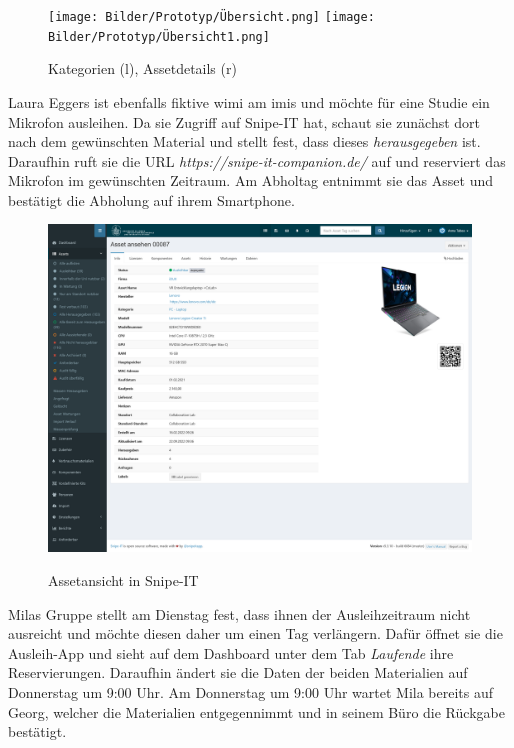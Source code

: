 \begin{figure}[h]
    \centering
    \texttt{[image: Bilder/Prototyp/Übersicht.png]}\hspace{2em}
    \texttt{[image: Bilder/Prototyp/Übersicht1.png]}
    \label{fig:p4}
    \caption[Mockup: Kategorien, Assets, Assetdetails]{Kategorien (l), Assetdetails (r)}
\end{figure}

Laura Eggers ist ebenfalls fiktive \ac{wimi} am \ac{imis} und möchte für eine
Studie ein Mikrofon ausleihen. Da sie Zugriff auf Snipe-IT hat, schaut sie
zunächst dort nach dem gewünschten Material und stellt fest, dass dieses
\textit{herausgegeben} ist. Daraufhin ruft sie die URL
\textit{https://snipe-it-companion.de/} auf und reserviert das Mikrofon im
gewünschten Zeitraum. Am Abholtag entnimmt sie das Asset und bestätigt die
Abholung auf ihrem Smartphone. 

\begin{figure}[h]
    \centering
    \includegraphics[scale=0.16]{Bilder/Screenshot 2022-10-14 at 11-26-25 Asset ansehen 00087 Ausleihmanagement.png}
    \label{fig:p4}
    \caption[Assetansicht in Snipe-IT]{Assetansicht in Snipe-IT}
\end{figure}

Milas Gruppe stellt am Dienstag fest, dass ihnen der Ausleihzeitraum nicht
ausreicht und möchte diesen daher um einen Tag verlängern. Dafür öffnet sie die
Ausleih-App und sieht auf dem Dashboard unter dem Tab \textit{Laufende} ihre
Reservierungen. Daraufhin ändert sie die Daten der beiden Materialien auf
Donnerstag um 9:00 Uhr. Am Donnerstag um 9:00 Uhr wartet Mila bereits auf Georg,
welcher die Materialien entgegennimmt und in seinem Büro die Rückgabe bestätigt.

